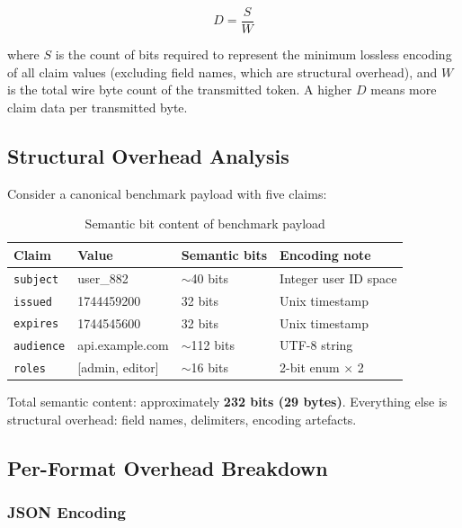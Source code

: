 \documentclass[11pt, letterpaper]{article}
\begin{document}
\begin{equation}
  D = \frac{S}{W}
  \label{eq:density}
\end{equation}

where $S$ is the count of bits required to represent the minimum lossless
encoding of all claim values (excluding field names, which are structural
overhead), and $W$ is the total wire byte count of the transmitted token.
A higher $D$ means more claim data per transmitted byte.

\subsection{Structural Overhead Analysis}

Consider a canonical benchmark payload with five claims:

\begin{table}[H]
\centering
\caption{Semantic bit content of benchmark payload}
\small
\begin{tabularx}{\linewidth}{L{2.4cm} L{3.4cm} L{2.4cm} X}
\toprule
{}
\color{white}\textbf{Claim} &
\color{white}\textbf{Value} &
\color{white}\textbf{Semantic bits} &
\color{white}\textbf{Encoding note} \\
\midrule
\texttt{subject}  & user\_882         & $\sim$40 bits  & Integer user ID space \\
\texttt{issued}   & 1744459200        & 32 bits        & Unix timestamp \\
\texttt{expires}  & 1744545600        & 32 bits        & Unix timestamp \\
\texttt{audience} & api.example.com   & $\sim$112 bits & UTF-8 string \\
\texttt{roles}    & [admin, editor]   & $\sim$16 bits  & 2-bit enum $\times$ 2 \\
\bottomrule
\end{tabularx}
\end{table}

Total semantic content: approximately \textbf{232 bits (29 bytes)}.
Everything else is structural overhead: field names, delimiters, encoding
artefacts.

\subsection{Per-Format Overhead Breakdown}

\subsubsection{JSON Encoding}
\end{document}
